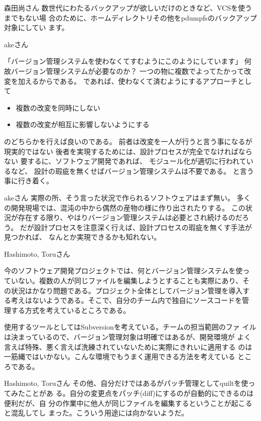 \documentclass[cjk,dvipdfmx,12pt]{beamer}
\begin{document}
\begin{frame}{森田尚さん}
数世代にわたるバックアップが欲しいだけのときなど、VCSを使うまでもない場
合のために、ホームディレクトリその他をpdumpfsのバックアップ対象にしてい
ます。

\end{frame}\begin{frame}{akeさん}

「バージョン管理システムを使わなくてすむようにこのようにしています」
何故バージョン管理システムが必要なのか？
一つの物に複数でよってたかって改変を加えるからである。
であれば、使わなくて済むようにするアプローチとして
\begin{itemize}
 \item 複数の改変を同時にしない
 \item 複数の改変が相互に影響しないようにする
\end{itemize}

のどちらかを行えば良いのである。
前者は改変を一人が行うと言う事になるが現実的ではない
後者を実現するためには、設計プロセスが完全でなければならない
要するに、ソフトウェア開発であれば、
モジュール化が適切に行われているなど、
設計の瑕疵を無くせばバージョン管理システムは不要である。
と言う事に行き着く。
\end{frame}\begin{frame}{akeさん}
実際の所、そう言った状況で作られるソフトウェアはまず無い。
多くの開発現場では、混沌の中から偶然の産物の様に作り出されたりする。
この状況が存在する限り、やはりバージョン管理システムは必要とされ続けるのだろう。
だが設計プロセスを注意深く行えば、設計プロセスの瑕疵を無くす手法が見つかれば、
なんとか実現できるかも知れない。

\end{frame}\begin{frame}{Hashimoto, Toruさん}

  今のソフトウェア開発プロジェクトでは、何とバージョン管理システムを使っ
ていない。複数の人が同じファイルを編集しようとすることも実際にあり、そ
の状況はかなり問題である。プロジェクト全体としてバージョン管理を導入す
る考えはないようである。そこで、自分のチーム内で独自にソースコードを管
理する方式を考えているところである。

  使用するツールとしてはSubversionを考えている。チームの担当範囲のファ
イルは決まっているので、バージョン管理対象は明確ではあるが、開発環境が
よく言えば特殊、悪く言えば洗練されていないために実際にきれいに適用する
のは一筋縄ではいかない。こんな環境でもうまく運用できる方法を考えている
ところである。

\end{frame}\begin{frame}{Hashimoto, Toruさん}
  その他、自分だけではあるがパッチ管理としてquiltを使ってみたことがあ
る。自分の変更点をパッチ(diff)にするのが自動的にできるのは便利だが、自
分の作業中に他人が同じファイルを編集するということが起こると混乱してし
まった。こういう用途には向かないようだ。


\end{frame}
\end{document}

